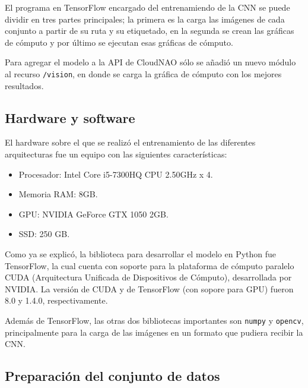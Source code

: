El programa en TensorFlow encargado del entrenamiendo de la CNN se puede dividir en tres partes principales; la primera es la carga las imágenes de cada conjunto a partir de su ruta y su etiquetado, en la segunda
se crean las gráficas de cómputo y por último se ejecutan esas gráficas de cómputo.

Para agregar el modelo a la API de CloudNAO sólo se añadió un nuevo módulo
al recurso \texttt{/vision}, en donde se carga la gráfica de cómputo 
con los mejores resultados.



\subsection{Hardware y software}

El hardware sobre el que se realizó el entrenamiento de las
diferentes arquitecturas fue un equipo con las siguientes características:

\begin{itemize}

\item Procesador: Intel Core i5-7300HQ CPU 2.50GHz x 4.
\item Memoria RAM: 8GB.
\item GPU:  NVIDIA GeForce GTX 1050 2GB.
\item SSD: 250 GB.
\end{itemize}

Como ya se explicó, la biblioteca para desarrollar el modelo en Python fue TensorFlow, la cual cuenta
con soporte para la plataforma de cómputo paralelo CUDA (Arquitectura
Unificada de Dispositivos de Cómputo), desarrollada por NVIDIA.
La versión de CUDA y de TensorFlow (con sopore para GPU) fueron 8.0 y 1.4.0, respectivamente.

Además de TensorFlow, las otras dos bibliotecas importantes son 
\texttt{numpy} y \texttt{opencv}, principalmente para la carga de
las imágenes en un formato que pudiera recibir la CNN.


\subsection{Preparación del conjunto de datos}

